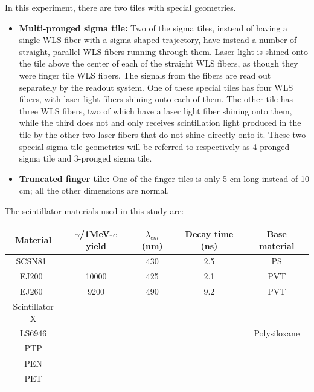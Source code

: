 In this experiment, there are two tiles with special geometries.
\begin{itemize}
\item \textbf{Multi-pronged sigma tile:} Two of the sigma tiles, instead of having a single WLS fiber with a sigma-shaped trajectory, have instead a number of straight, parallel WLS fibers running through them. Laser light is shined onto the tile above the center of each of the straight WLS fibers, as though they were finger tile WLS fibers. The signals from the fibers are read out separately by the readout system. One of these special tiles has four WLS fibers, with laser light fibers shining onto each of them. The other tile has three WLS fibers, two of which have a laser light fiber shining onto them, while the third does not and only receives scintillation light produced in the tile by the other two laser fibers that do not shine directly onto it. These two special sigma tile geometries will be referred to respectively as 4-pronged sigma tile and 3-pronged sigma tile.
\item \textbf{Truncated finger tile:} One of the finger tiles is only 5 cm long instead of 10 cm; all the other dimensions are normal.
\end{itemize}

The scintillator materials used in this study are:

\begin{table}[htbh]
\begin{center}
\begin{tabular}{|c|c|c|c|c|}
\hline
Material & $\gamma$/1MeV-$e$ yield & $\lambda_{em}$ (nm) & Decay time (ns) & Base material \\
\hline
\hline
SCSN81~\cite{Kuraray} &  & 430 & 2.5 & PS \\
EJ200~\cite{EJ200} & 10000 & 425 & 2.1 & PVT \\
EJ260~\cite{EJ260} & 9200 & 490 & 9.2 & PVT \\
Scintillator X &  &  &  &  \\
LS6946 &  &  &  & Polysiloxane \\
PTP &  &  &  &  \\
PEN &  &  &  &  \\
PET &  &  &  &  \\
\hline
\end{tabular}
\end{center}
\end{table}

